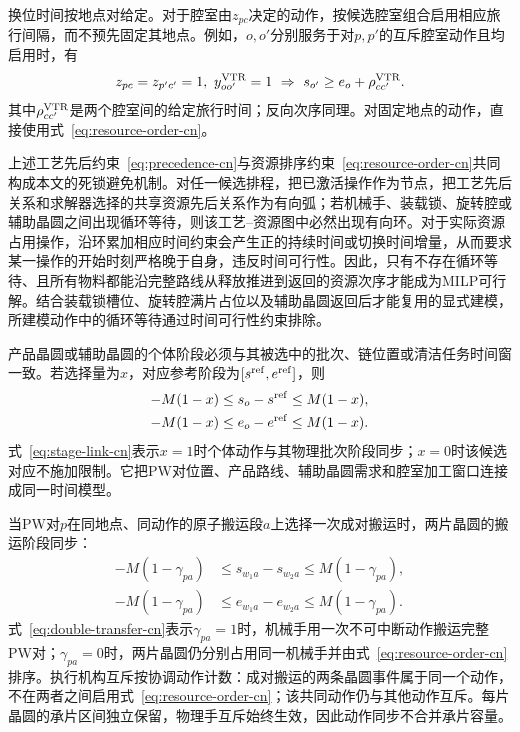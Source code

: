 \documentclass[final,5p,times,twocolumn]{elsarticle}
\begin{document}
换位时间按地点对给定。对于腔室由$z_{pc}$决定的动作，按候选腔室组合启用相应旅行间隔，而不预先固定其地点。例如，$o,o'$分别服务于对$p,p'$的互斥腔室动作且均启用时，有
\begin{equation}
\begin{aligned}
z_{pc}=z_{p'c'}=1,\ y^{\rm VTR}_{oo'}=1
\ \Rightarrow\ s_{o'}\ge e_o+\rho^{\rm VTR}_{cc'}.
\end{aligned}
\label{eq:location-travel-cn}
\end{equation}
其中$\rho^{\rm VTR}_{cc'}$是两个腔室间的给定旅行时间；反向次序同理。对固定地点的动作，直接使用式~\eqref{eq:resource-order-cn}。

上述工艺先后约束~\eqref{eq:precedence-cn}与资源排序约束~\eqref{eq:resource-order-cn}共同构成本文的死锁避免机制。对任一候选排程，把已激活操作作为节点，把工艺先后关系和求解器选择的共享资源先后关系作为有向弧；若机械手、装载锁、旋转腔或辅助晶圆之间出现循环等待，则该工艺--资源图中必然出现有向环。对于实际资源占用操作，沿环累加相应时间约束会产生正的持续时间或切换时间增量，从而要求某一操作的开始时刻严格晚于自身，违反时间可行性。因此，只有不存在循环等待、且所有物料都能沿完整路线从释放推进到返回的资源次序才能成为MILP可行解。结合装载锁槽位、旋转腔满片占位以及辅助晶圆返回后才能复用的显式建模，所建模动作中的循环等待通过时间可行性约束排除。

产品晶圆或辅助晶圆的个体阶段必须与其被选中的批次、链位置或清洁任务时间窗一致。若选择量为$x$，对应参考阶段为$[s^{\rm ref},e^{\rm ref}]$，则
\begin{equation}
\begin{aligned}
-M(1-x)&\le s_o-s^{\rm ref}\le M(1-x),\\
-M(1-x)&\le e_o-e^{\rm ref}\le M(1-x).
\end{aligned}
\label{eq:stage-link-cn}
\end{equation}
式~\eqref{eq:stage-link-cn}表示$x=1$时个体动作与其物理批次阶段同步；$x=0$时该候选对应不施加限制。它把PW对位置、产品路线、辅助晶圆需求和腔室加工窗口连接成同一时间模型。

当PW对$p$在同地点、同动作的原子搬运段$a$上选择一次成对搬运时，两片晶圆的搬运阶段同步：
\begin{equation}
\begin{aligned}
-M(1-\gamma_{pa})&\le s_{w_1a}-s_{w_2a}\le M(1-\gamma_{pa}),\\
-M(1-\gamma_{pa})&\le e_{w_1a}-e_{w_2a}\le M(1-\gamma_{pa}).
\end{aligned}
\label{eq:double-transfer-cn}
\end{equation}
式~\eqref{eq:double-transfer-cn}表示$\gamma_{pa}=1$时，机械手用一次不可中断动作搬运完整PW对；$\gamma_{pa}=0$时，两片晶圆仍分别占用同一机械手并由式~\eqref{eq:resource-order-cn}排序。执行机构互斥按协调动作计数：成对搬运的两条晶圆事件属于同一个动作，不在两者之间启用式~\eqref{eq:resource-order-cn}；该共同动作仍与其他动作互斥。每片晶圆的承片区间独立保留，物理手互斥始终生效，因此动作同步不合并承片容量。
\end{document}
